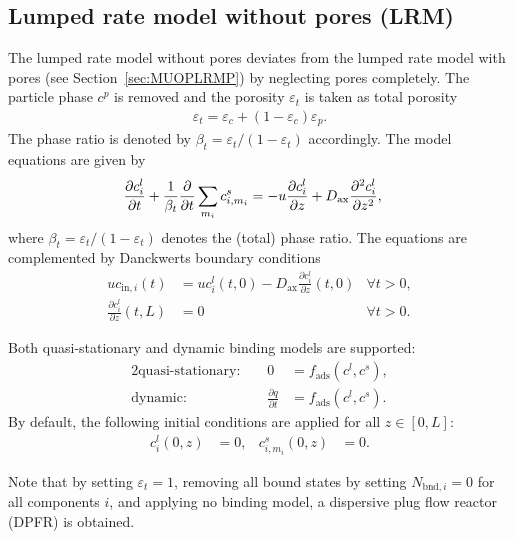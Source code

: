 \subsection{Lumped rate model without pores (LRM)}\label{sec:MUOPLRM}

The lumped rate model without pores  \cite{Guiochon2006,Felinger2004} deviates from the lumped rate model with pores (see Section~\ref{sec:MUOPLRMP}) by neglecting pores completely.
The particle phase $c^p$ is removed and the porosity $\varepsilon_t$ is taken as total porosity
\begin{align}
	\varepsilon_t = \varepsilon_c + \left( 1 - \varepsilon_c \right) \varepsilon_p. \label{eq:TotalPorosity}
\end{align}
The phase ratio is denoted by $\beta_t = \varepsilon_t / (1 - \varepsilon_t)$ accordingly.
The model equations are given by
\begin{align}
	\frac{\partial c^l_i}{\partial t} + \frac{1}{\beta_t} \frac{\mathop{}\!\mathrm{\partial}}{\mathop{}\!\mathrm{\partial} t} \sum_{m_i} c^s_{i,m_i} &= -u \frac{\partial c^l_i}{\partial z} + D_{\text{ax}} \frac{\partial^2 c^l_i}{\partial z^2},
\end{align}
where $\beta_t = \varepsilon_t / (1 - \varepsilon_t)$ denotes the (total) phase ratio.
The equations are complemented by Danckwerts boundary conditions \cite{Danckwerts1953}
\begin{align*}
	u c_{\text{in},i}(t) &= u c^l_i(t,0) - D_{\text{ax}} \frac{\partial c^l_i}{\partial z}(t, 0) & \forall t > 0,\\
	\frac{\partial c^l_i}{\partial z}(t, L) &= 0 & \forall t > 0.
\end{align*}

Both quasi-stationary and dynamic binding models are supported:
\begin{alignat*}{2}
	\text{quasi-stationary: }& & 0 &= f_{\text{ads}}\left( c^l, c^s\right), \\
	\text{dynamic: }& & \frac{\partial q}{\partial t} &= f_{\text{ads}}\left( c^l, c^s\right).
\end{alignat*}
By default, the following initial conditions are applied for all $z \in [0,L]$:
\begin{align}
	c^l_i(0, z) &= 0, & c^s_{i,m_i}(0,z) &= 0.
\end{align}

Note that by setting $\varepsilon_t = 1$, removing all bound states by setting $N_{\text{bnd},i} = 0$ for all components $i$, and applying no binding model, a dispersive plug flow reactor (DPFR) is obtained.

